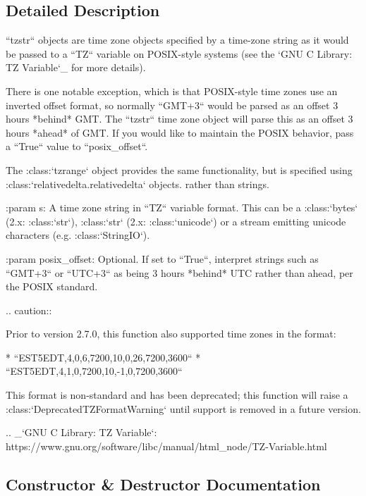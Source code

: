\subsection{Detailed Description}
\begin{DoxyVerb}``tzstr`` objects are time zone objects specified by a time-zone string as
it would be passed to a ``TZ`` variable on POSIX-style systems (see
the `GNU C Library: TZ Variable`_ for more details).

There is one notable exception, which is that POSIX-style time zones use an
inverted offset format, so normally ``GMT+3`` would be parsed as an offset
3 hours *behind* GMT. The ``tzstr`` time zone object will parse this as an
offset 3 hours *ahead* of GMT. If you would like to maintain the POSIX
behavior, pass a ``True`` value to ``posix_offset``.

The :class:`tzrange` object provides the same functionality, but is
specified using :class:`relativedelta.relativedelta` objects. rather than
strings.

:param s:
    A time zone string in ``TZ`` variable format. This can be a
    :class:`bytes` (2.x: :class:`str`), :class:`str` (2.x:
    :class:`unicode`) or a stream emitting unicode characters
    (e.g. :class:`StringIO`).

:param posix_offset:
    Optional. If set to ``True``, interpret strings such as ``GMT+3`` or
    ``UTC+3`` as being 3 hours *behind* UTC rather than ahead, per the
    POSIX standard.

.. caution::

    Prior to version 2.7.0, this function also supported time zones
    in the format:

        * ``EST5EDT,4,0,6,7200,10,0,26,7200,3600``
        * ``EST5EDT,4,1,0,7200,10,-1,0,7200,3600``

    This format is non-standard and has been deprecated; this function
    will raise a :class:`DeprecatedTZFormatWarning` until
    support is removed in a future version.

.. _`GNU C Library: TZ Variable`:
    https://www.gnu.org/software/libc/manual/html_node/TZ-Variable.html
\end{DoxyVerb}
 

\subsection{Constructor \& Destructor Documentation}
\mbox{\label{classdateutil_1_1tz_1_1tz_1_1tzstr_a69e92dce6740e41325a7a1b03a632a2f}} 
